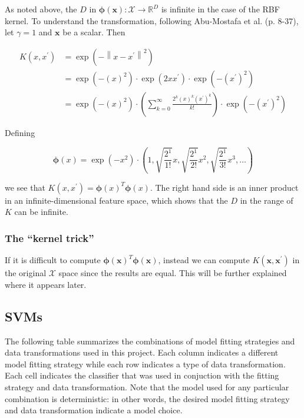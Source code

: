 \documentclass[letterpaper, 12pt]{article}
\newcommand{\norm}[1]{\left\lVert #1 \right\rVert}
\newcommand{\vect}[1]{\boldsymbol{#1}}
\begin{document}
As noted above, the $D$ in $\vect{\phi}(\vect{x}): \mathcal{X} \rightarrow \mathbb{R}^D$ is infinite in the case of the RBF kernel. To understand the transformation, following Abu-Mostafa et al. (p. 8-37), let $\gamma = 1$ and $\vect{x}$ be a scalar. Then

\begin{align*}
  K(x, x^\prime) & = \exp\left(-\norm{x - x^\prime}^2\right) \\
  & = \exp\left(-(x)^2\right) \cdot \exp\left(2xx^\prime\right) \cdot \exp(-\left(x^\prime\right)^2) \\
  & = \exp\left(-(x)^2\right) \cdot \left(\sum_{k=0}^{\infty} \frac{2^k(x)^k\left(x^\prime\right)^k}{k!}\right) \cdot \exp\left(-\left(x^\prime\right)^2\right)
\end{align*}

Defining

\begin{equation*}
  \vect{\phi}(x) = \exp(-x^2) \cdot \left(1, \sqrt{\frac{2^1}{1!}}x, \sqrt{\frac{2^1}{2!}}x^2, \sqrt{\frac{2^1}{3!}}x^3, \ldots \right)
\end{equation*}

we see that $K(x, x^\prime) = \vect{\phi}(x)^T \vect{\phi}(x)$. The right hand side is an inner product in an infinite-dimensional feature space, which shows that the $D$ in the range of $K$ can be infinite.

\subsubsection{The ``kernel trick''}

If it is difficult to compute $\vect{\phi}(\vect{x})^T \vect{\phi}(\vect{x})$, instead we can compute $K(\vect{x}, \vect{x}^\prime)$ in the original $\mathcal{X}$ space since the results are equal. This will be further explained where it appears later.

\subsection{SVMs}

The following table summarizes the combinations of model fitting strategies and data transformations used in this project. Each column indicates a different model fitting strategy while each row indicates a type of data transformation. Each cell indicates the classifier that was used in conjuction with the fitting strategy and data transformation. Note that the model used for any particular combination is deterministic: in other words, the desired model fitting strategy and data transformation indicate a model choice.
\end{document}
